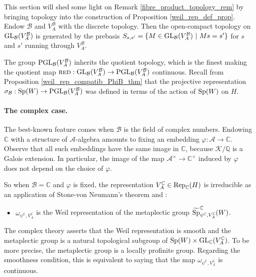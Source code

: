 \documentclass[11pt]{article}
\theoremstyle{plain}
\theoremstyle{definition}
\theoremstyle{plain}
\theoremstyle{definition}
\theoremstyle{plain}
\begin{document}
This section will shed some light on Remark \ref{fibre_product_topology_rem} by bringing topology into the construction of Proposition \ref{weil_rep_def_prop}. Endow $\mathcal{B}$ and $V_A^\mathcal{B}$ with the discrete topology. Then the open-compact topology on $\textup{GL}_\mathcal{B}(V_A^\mathcal{B})$ is generated by the prebasis $S_{s,s'} = \{ M \in \textup{GL}_\mathcal{B}(V_A^\mathcal{B}) \ | \ Ms =s' \}$ for $s$ and $s'$ running through $V_A^\mathcal{B}$.

The group $\textup{PGL}_\mathcal{B}(V_A^\mathcal{B})$ inherits the quotient topology, which is the finest making the quotient map $\textup{\textsc{red}} : \textup{GL}_\mathcal{B}(V_A^\mathcal{B}) \to \textup{PGL}_\mathcal{B}(V_A^\mathcal{B})$ continuous. Recall from Proposition \ref{weil_rep_compatib_PhiB_thm} that the projective representation $\sigma_\mathcal{B} : \textup{Sp}(W) \to  \textup{PGL}_\mathcal{B}(V_A^\mathcal{B})$ was defined in terms of the action of $\textup{Sp}(W)$ on $H$.

\paragraph{The complex case.} The best-known feature comes when $\mathcal{B}$ is the field of complex numbers. Endowing $\mathbb{C}$ with a structure of $\mathcal{A}$-algebra amounts to fixing an embedding $\varphi : \mathcal{A} \to \mathbb{C}$. Observe that all such embeddings have the same image in $\mathbb{C}$, because $\mathcal{K}  / \mathbb{Q}$ is a Galois extension. In particular, the image of the map $\mathcal{A}^\times \to \mathbb{C}^\times$ induced by $\varphi$ does not depend on the choice of $\varphi$.

So when $\mathcal{B}=\mathbb{C}$ and $\varphi$ is fixed, the representation $V_A^\mathbb{C} \in \textup{Rep}_\mathbb{C}(H)$ is irreducible as an application of Stone-von Neumann's theorem \cite[Chap. 2, Th. I.2]{mvw} and : 
\begin{itemize}[label=$\bullet$]
\item $\omega_{\psi^\mathbb{C},V_A^\mathbb{C}}$ is the Weil representation of the metaplectic group $\widetilde{\textup{Sp}}_{\psi^\mathbb{C},V_A^\mathbb{C}}^\mathbb{C}(W)$.
\end{itemize}
The complex theory asserts that the Weil representation is smooth and the metaplectic group is a natural topological subgroup of $\textup{Sp}(W) \times \textup{GL}_\mathbb{C}(V_A^\mathbb{C})$. To be more precise, the metaplectic group is a locally profinite group. Regarding the smoothness condition, this is equivalent to saying that the map $\omega_{\psi^\mathbb{C},V_A^\mathbb{C}}$ is continuous.
\end{document}
